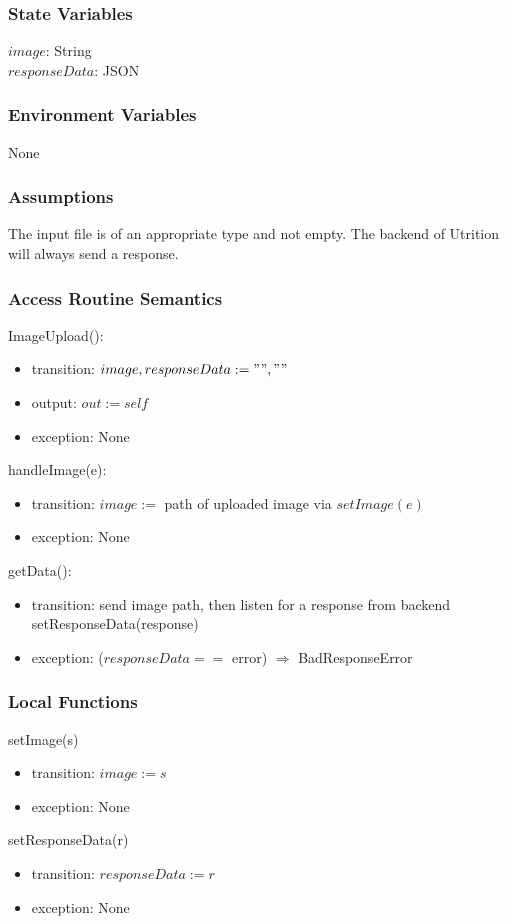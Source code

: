 \documentclass[12pt, titlepage]{article}
\begin{document}
\subsubsection{State Variables}
$image$: String\\
$responseData$: JSON
\subsubsection{Environment Variables}
None
\subsubsection{Assumptions}
The input file is of an appropriate type and not empty. The backend of Utrition will always send a response.
\subsubsection{Access Routine Semantics}
ImageUpload():
\begin{itemize}
	\item transition: $image, responseData := "", ""$
	\item output: $out := self$
	\item exception: None
\end{itemize}
\noindent
handleImage(e):
\begin{itemize}
	\item transition: $image :=$ path of uploaded image via $setImage(e)$
	\item exception: None
\end{itemize}
\noindent
getData():
\begin{itemize}
	\item transition: send image path, then listen for a response from 
	backend\\ setResponseData(response)
	\item exception: ($responseData ==$ error) $\Rightarrow$ BadResponseError
\end{itemize}
\subsubsection{Local Functions}
\noindent setImage(s)
\begin{itemize}
	\item transition: $ image :=s $
	\item exception: None
\end{itemize}
\noindent setResponseData(r)
\begin{itemize}
	\item transition: $ responseData:=r $
	\item exception: None
\end{itemize}
\end{document}
